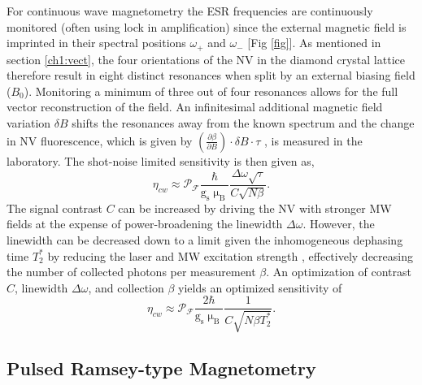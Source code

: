 For continuous wave magnetometry the ESR frequencies are continuously monitored (often using lock in amplification) since the external magnetic field is imprinted in their spectral positions $\omega_+$ and $\omega_-$ [Fig \ref{fig}]. As mentioned in section \ref{ch1:vect}, the four orientations of the NV in the diamond crystal lattice therefore result in eight distinct resonances when split by an external biasing field ($B_0$). Monitoring a minimum of three out of four resonances allows for the full vector reconstruction of the field. An infinitesimal additional magnetic field variation $\delta B$ shifts the resonances away from the known spectrum and the change in NV fluorescence, which is given by $\left(\frac{\partial \beta}{\partial B}\right) \cdot \delta B \cdot \tau$ \cite{rondin2014magnetometry}, is measured in the laboratory. The shot-noise limited sensitivity is then given as,
\begin{equation}
\eta_{cw} \approx \mathcal{P}_\mathcal{F}\frac{\hbar}{\text{g}_\text{s} \upmu_\text{B}} \frac{\Delta \omega \sqrt{\tau}}{C\sqrt{N \beta}}. 
\end{equation}
The signal contrast $C$ can be increased by driving the NV with stronger MW fields at the expense of power-broadening the linewidth $\Delta \omega$. However, the linewidth can be decreased down to a limit given the inhomogeneous dephasing time $T_2^*$ by reducing the laser and MW excitation strength \cite{dreau2011avoiding}, effectively decreasing the number of collected photons per measurement $\beta$. An optimization of contrast $C$, linewidth $\Delta \omega$, and collection $\beta$ yields an optimized sensitivity of \cite{pham2013magnetic}
\begin{equation}
\eta_{cw} \approx  \mathcal{P}_\mathcal{F}\frac{2\hbar}{\text{g}_\text{s} \upmu_\text{B}} \frac{1}{C\sqrt{N \beta T_2^*}}.
\end{equation}


\subsection{Pulsed Ramsey-type Magnetometry} \label{Pulsed_Ramsey}


